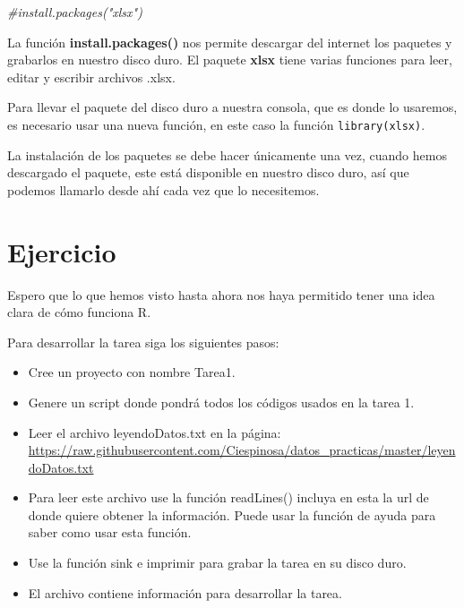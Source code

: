 \documentclass[
]{article}
\newenvironment{Shaded}{\begin{snugshade}}{\end{snugshade}}
\newcommand{\CommentTok}[1]{\textcolor[rgb]{0.56,0.35,0.01}{\textit{#1}}}
\providecommand{\tightlist}{%
  \setlength{\itemsep}{0pt}\setlength{\parskip}{0pt}}
\begin{document}
\begin{Shaded}
\begin{Highlighting}[]
\CommentTok{\#install.packages("xlsx")}
\end{Highlighting}
\end{Shaded}

La función \textbf{install.packages()} nos permite descargar del
internet los paquetes y grabarlos en nuestro disco duro. El paquete
\textbf{xlsx} tiene varias funciones para leer, editar y escribir
archivos .xlsx.

Para llevar el paquete del disco duro a nuestra consola, que es donde lo
usaremos, es necesario usar una nueva función, en este caso la función
\texttt{library(xlsx)}.

La instalación de los paquetes se debe hacer únicamente una vez, cuando
hemos descargado el paquete, este está disponible en nuestro disco duro,
así que podemos llamarlo desde ahí cada vez que lo necesitemos.

\hypertarget{ejercicio}{%
\section{Ejercicio}\label{ejercicio}}

Espero que lo que hemos visto hasta ahora nos haya permitido tener una
idea clara de cómo funciona R.

Para desarrollar la tarea siga los siguientes pasos:

\begin{itemize}
\tightlist
\item
  Cree un proyecto con nombre Tarea1.
\item
  Genere un script donde pondrá todos los códigos usados en la tarea 1.
\item
  Leer el archivo leyendoDatos.txt en la página:
  \url{https://raw.githubusercontent.com/Ciespinosa/datos_practicas/master/leyendoDatos.txt}
\item
  Para leer este archivo use la función readLines() incluya en esta la
  url de donde quiere obtener la información. Puede usar la función de
  ayuda para saber como usar esta función.
\item
  Use la función sink e imprimir para grabar la tarea en su disco duro.
\item
  El archivo contiene información para desarrollar la tarea.
\end{itemize}
\end{document}
